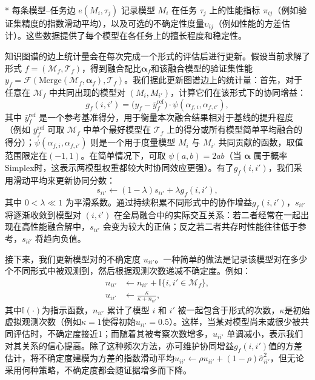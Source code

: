 \documentclass[../main.tex]{subfiles}
\begin{document}
* 每条模型--任务边 $e(M_i, \tau_j)$ 记录模型 $M_i$ 在任务 $\tau_j$ 上的性能指标 $\pi_{ij}$（例如验证集精度的指数滑动平均），以及可选的不确定性度量$\upsilon_{ij}$（例如性能的方差估计）。这些数据提供了每个模型在各任务上的擅长程度和稳定性。

知识图谱的边上统计量会在每次完成一个形式的评估后进行更新。假设当前求解了形式 $f=(\mathcal{M}_f,\mathcal{T}_f)$，得到融合配比$\boldsymbol{\alpha}_f$和该融合模型的验证集性能$y_f=\mathcal{F}(\mathrm{Merge}(\mathcal{M}_f,\boldsymbol{\alpha}_f), \mathcal{T}_f)$。我们据此更新图谱边上的统计量：首先，对于任意在 $\mathcal{M}_f$ 中共同出现的模型对 $(M_i, M_{i'})$，计算它们在该形式下的协同增益：
\begin{equation}
	g_f(i,i') = \Big(y_f - \bar{y}^{\text{ref}}_f\Big) \cdot \psi(\alpha_{f,i}, \alpha_{f,i'}),
\end{equation}
其中 $\bar{y}^{\text{ref}}_f$ 是一个参考基准得分，用于衡量本次融合结果相对于基线的提升程度（例如 $\bar{y}^{\text{ref}}_f$ 可取 $\mathcal{M}_f$ 中单个最好模型在 $\mathcal{T}_f$ 上的得分或所有模型简单平均融合的得分）；$\psi(\alpha_{f,i},\alpha_{f,i'})$ 则是一个用于度量模型 $M_i$ 与 $M_{i'}$ 共同贡献的函数，取值范围限定在$(-1,1)$。在简单情况下，可取 $\psi(a,b)=2ab$（当 $\boldsymbol{\alpha}$ 属于概率Simplex时，这表示两模型权重都较大时协同效应更强）。有了$g_f(i,i')$，我们采用滑动平均来更新协同分数：
\begin{equation}
	s_{ii'} \leftarrow (1-\lambda) s_{ii'} + \lambda g_f(i,i'),
\end{equation}
其中 $0<\lambda\ll 1$ 为平滑系数。通过持续积累不同形式中的协作增益$g_f(i,i')$，$s_{ii'}$ 将逐渐收敛到模型对 $(i,i')$ 在全局融合中的实际交互关系：若二者经常在一起出现在高性能融合解中，$s_{ii'}$ 会变为较大的正值；反之若二者共存时性能往往低于参考，$s_{ii'}$ 将趋向负值。

接下来，我们更新模型对的不确定度 $u_{ii'}$。一种简单的做法是记录该模型对在多少个不同形式中被观测到，然后根据观测次数递减不确定度。例如：
\begin{equation}
	\begin{aligned}
		n_{ii'} & \leftarrow n_{ii'} + \mathbb{I}\{i,i'\in\mathcal{M}_f\}, \\
		u_{ii'} & \leftarrow \frac{\kappa}{\kappa + n_{ii'}},
	\end{aligned}
\end{equation}
其中$\mathbb{I}(\cdot)$为指示函数，$n_{ii'}$ 累计了模型 $i$ 和 $i'$ 被一起包含于形式的次数，$\kappa$是初始虚拟观测次数（例如$\kappa=1$使得初始$u_{ii'}=0.5$）。这样，当某对模型尚未或很少被共同评估时，不确定度接近1；而随着其被考察次数增多，$u_{ii'}$ 单调减小，表示我们对其关系的信心提高。除了这种频次方法，亦可维护协同增益$g_f(i,i')$值的方差估计，将不确定度建模为方差的指数滑动平均$u_{ii'} \leftarrow \rho u_{ii'} + (1-\rho)\hat{\sigma}_{ii'}^2$，但无论采用何种策略，不确定度都会随证据增多而下降。
\end{document}
